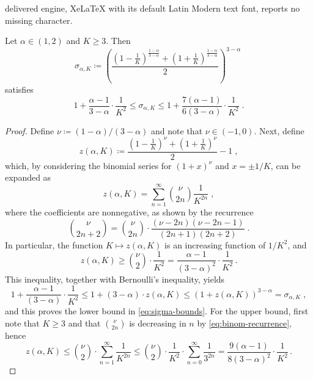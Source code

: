 \documentclass[10pt,a4paper]{amsart}
\newcommand{\lrb}[1]{\left(#1\right)}
\begin{document}
delivered engine, XeLaTeX with its default Latin Modern text font, reports no missing character.
\begin{proposition}\label{prop:sigma}
Let $\alpha \in (1,2)$ and $K \geq 3$.
Then
 \[
     \sigma_{\alpha, K}
\coloneq
    \lrb{  \frac{ (1-\frac{1}{K})^{\frac{1 - \alpha}{3- \alpha}} + (1+\frac{1}{K})^{\frac{1 - \alpha}{3- \alpha}} }{2} }^{3 - \alpha}\;
\]
satisfies
\begin{equation}\label{eq:sigma-bounds}    
    1 + \frac{\alpha - 1}{3- \alpha} \cdot 
        \frac{1}{K^2} 
\le
    \sigma_{\alpha, K}
\le
    1 + \frac{7(\alpha - 1)}{6(3- \alpha)} \cdot 
        \frac{1}{K^2}\;.
\end{equation}
\end{proposition}

\begin{proof}
Define $\nu \coloneq (1 - \alpha)/(3- \alpha)$ and note that $\nu \in (-1,0)$.
Next, define
\[
    z(\alpha, K)
\coloneq
    \frac{ (1-\frac{1}{K})^{\nu} + (1+\frac{1}{K})^{\nu} }{2} - 1\;,
\]
which, by considering the binomial series for $(1 + x)^\nu$ and $x = \pm 1/K$, can be expanded as
\begin{equation}\label{eq:z-expasion}
    z(\alpha, K)
=
    \sum_{n=1}^{\infty} \binom{\nu}{2n} \frac{1}{K^{2n}}\;,    
\end{equation}
where the coefficients are nonnegative, as shown by the recurrence 
\begin{equation}\label{eq:binom-recurrence}    
    \binom{\nu}{2n+2} 
= 
    \binom{\nu}{2n}
    \cdot
    \frac{(\nu- 2n)(\nu - 2n - 1)}{ (2n + 1)(2n + 2) }\;.
\end{equation}
In particular, the function $K \mapsto z(\alpha, K)$ is an increasing function of $1/K^2$, and 
\[
    z(\alpha, K)
\ge
    \binom{\nu}{2}\cdot  \frac{1}{K^{2}}
=
    \frac{\alpha - 1}{(3- \alpha)^2} \cdot \frac{1}{K^2}\,.
\]
This inequality, together with Bernoulli's inequality, yields
\[
    1 +  \frac{\alpha - 1}{(3- \alpha)} \cdot \frac{1}{K^2}
\le
    1 + (3-\alpha)\cdot z(\alpha, K)
\le
    (1 + z(\alpha, K))^{3-\alpha}
=   
    \sigma_{\alpha, K}\;,
\]
and this proves the lower bound in \eqref{eq:sigma-bounds}.
For the upper bound, first note that $K \ge 3$ and that
$\binom{\nu}{2n}$ is decreasing in $n$ by \eqref{eq:binom-recurrence}, hence
\[
    z(\alpha, K)
\le
    \binom{\nu}{2}\cdot 
    \sum_{n=1}^{\infty}  \frac{1}{K^{2n}}
\le
    \binom{\nu}{2}\cdot 
    \frac{1}{K^2}\cdot 
    \sum_{n=0}^{\infty}  \frac{1}{3^{2n}}
=
    \frac{9(\alpha - 1)}{8(3- \alpha)^2}
    \cdot \frac{1}{K^2}\,.
\]
\end{proof}
\end{document}
